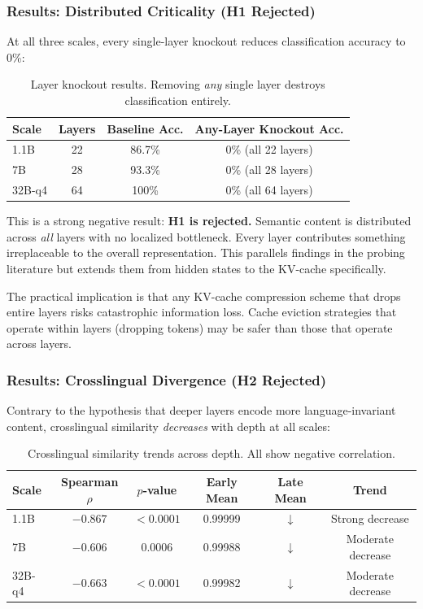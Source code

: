 \documentclass[11pt,a4paper]{article}
\begin{document}
\subsubsection{Results: Distributed Criticality (H1 Rejected)}

At all three scales, every single-layer knockout reduces classification accuracy to 0\%:

\begin{table}[H]
\centering
\caption{Layer knockout results. Removing \emph{any} single layer destroys classification entirely.}
\label{tab:knockout}
\begin{tabular}{lccc}
\toprule
\textbf{Scale} & \textbf{Layers} & \textbf{Baseline Acc.} & \textbf{Any-Layer Knockout Acc.} \\
\midrule
1.1B & 22 & 86.7\% & 0\% (all 22 layers) \\
7B & 28 & 93.3\% & 0\% (all 28 layers) \\
32B-q4 & 64 & 100\% & 0\% (all 64 layers) \\
\bottomrule
\end{tabular}
\end{table}

This is a strong negative result: \textbf{H1 is rejected.} Semantic content is distributed across \emph{all} layers with no localized bottleneck. Every layer contributes something irreplaceable to the overall representation. This parallels findings in the probing literature \citep{belinkov2022probing} but extends them from hidden states to the KV-cache specifically.

The practical implication is that any KV-cache compression scheme that drops entire layers risks catastrophic information loss. Cache eviction strategies \citep{zhang2024h2o} that operate within layers (dropping tokens) may be safer than those that operate across layers.

\subsubsection{Results: Crosslingual Divergence (H2 Rejected)}

Contrary to the hypothesis that deeper layers encode more language-invariant content, crosslingual similarity \emph{decreases} with depth at all scales:

\begin{table}[H]
\centering
\caption{Crosslingual similarity trends across depth. All show negative correlation.}
\label{tab:crosslingual}
\begin{tabular}{lccccc}
\toprule
\textbf{Scale} & \textbf{Spearman $\rho$} & \textbf{$p$-value} & \textbf{Early Mean} & \textbf{Late Mean} & \textbf{Trend} \\
\midrule
1.1B & $-0.867$ & $< 0.0001$ & 0.99999 & $\downarrow$ & Strong decrease \\
7B & $-0.606$ & $0.0006$ & 0.99988 & $\downarrow$ & Moderate decrease \\
32B-q4 & $-0.663$ & $< 0.0001$ & 0.99982 & $\downarrow$ & Moderate decrease \\
\bottomrule
\end{tabular}
\end{table}
\end{document}
